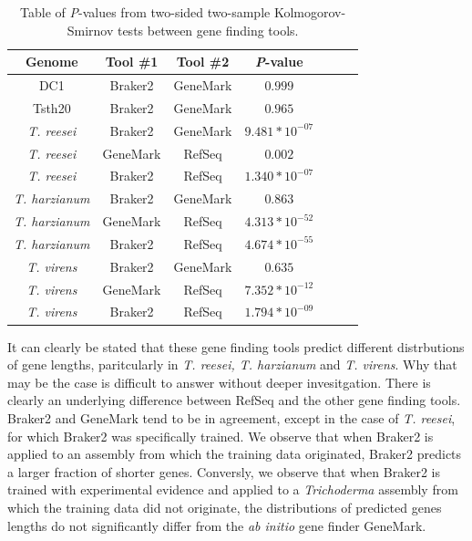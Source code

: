 \begin{table}
  \begin{center}
    \begin{tabular}{|c|c|c|c|c|c|c|}
      \hline
      Genome & Tool \#1 & Tool \#2 & \textit{P}-value  \\ \hline
      DC1 & Braker2 & GeneMark & $0.999$ \\ \hline
      Tsth20 & Braker2 & GeneMark & $0.965$ \\ \hline
      \textit{T. reesei} & Braker2 & GeneMark & $9.481*10^{-07}$ \\ \hline
      \textit{T. reesei} & GeneMark & RefSeq & $0.002$ \\ \hline
      \textit{T. reesei} & Braker2 & RefSeq & $1.340*10^{-07}$ \\ \hline
      \textit{T. harzianum} & Braker2 & GeneMark & $0.863$ \\ \hline
      \textit{T. harzianum} & GeneMark & RefSeq & $4.313*10^{-52}$ \\ \hline
      \textit{T. harzianum} & Braker2 & RefSeq & $4.674*10^{-55}$ \\ \hline
      \textit{T. virens} & Braker2 & GeneMark & $0.635$ \\ \hline
      \textit{T. virens} & GeneMark & RefSeq & $7.352*10^{-12}$ \\ \hline
      \textit{T. virens} & Braker2 & RefSeq & $1.794*10^{-09}$ \\ \hline
    \end{tabular}
  \end{center}
  \caption[Results of Kolmogorov-Smirnov tests]{Table of \textit{P}-values from two-sided two-sample
    Kolmogorov-Smirnov tests between gene finding tools.}
  \label{table:ks-2s}
\end{table}

It can clearly be stated that these gene finding tools predict
different distrbutions of gene lengths, paritcularly in
\textit{T. reesei, T. harzianum} and \textit{T. virens}. Why that may
be the case is difficult to answer without deeper invesitgation. There
is clearly an underlying difference between RefSeq and the other gene
finding tools. Braker2 and GeneMark tend to be in agreement, except in
the case of \textit{T. reesei}, for which Braker2 was specifically
trained. We observe that when Braker2 is applied to an assembly from
which the training data originated, Braker2 predicts a larger fraction
of shorter genes. Conversly, we observe that when Braker2 is trained
with experimental evidence and applied to a \textit{Trichoderma}
assembly from which the training data did not originate, the
distributions of predicted genes lengths do not significantly differ
from the \textit{ab initio} gene finder GeneMark.
